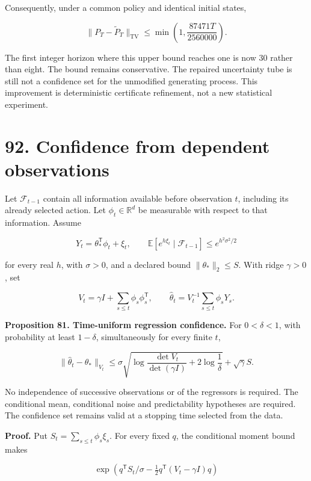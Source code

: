 \documentclass[11pt,letterpaper]{article}
\begin{document}
Consequently, under a common policy and identical initial states,

\[
\boxed{
\|P_T-\widetilde P_T\|_{\mathrm{TV}}
\leq\min\left(1,\frac{87471T}{2560000}\right).
}
\]

The first integer horizon where this upper bound reaches one is now 30
rather than eight. The bound remains conservative. The repaired
uncertainty tube is still not a confidence set for the unmodified
generating process. This improvement is deterministic certificate
refinement, not a new statistical experiment.

\newpage

\section{92. Confidence from dependent
observations}\label{confidence-from-dependent-observations}

Let \(\mathcal F_{t-1}\) contain all information available before
observation \(t\), including its already selected action. Let
\(\phi_t\in\mathbb R^d\) be measurable with respect to that information.
Assume

\[
Y_t=\theta_*^{\mathsf T}\phi_t+\xi_t,
\qquad
\mathbb E[e^{h\xi_t}\mid\mathcal F_{t-1}]
\leq e^{h^2\sigma^2/2}
\]

for every real \(h\), with \(\sigma>0\), and a declared bound
\(\|\theta_*\|_2\leq S\). With ridge \(\gamma>0\), set

\[
V_t=\gamma I+\sum_{s\leq t}\phi_s\phi_s^{\mathsf T},
\qquad
\widehat\theta_t=V_t^{-1}\sum_{s\leq t}\phi_sY_s.
\]

\textbf{Proposition 81. Time-uniform regression confidence.} For
\(0<\delta<1\), with probability at least \(1-\delta\), simultaneously
for every finite \(t\),

\[
\boxed{
\|\widehat\theta_t-\theta_*\|_{V_t}
\leq
\sigma\sqrt{
\log\frac{\det V_t}{\det(\gamma I)}+2\log\frac1\delta
}
+\sqrt\gamma S.
}
\]

No independence of successive observations or of the regressors is
required. The conditional mean, conditional noise and predictability
hypotheses are required. The confidence set remains valid at a stopping
time selected from the data.

\textbf{Proof.} Put \(S_t=\sum_{s\leq t}\phi_s\xi_s\). For every fixed
\(q\), the conditional moment bound makes

\[
\exp\left(q^{\mathsf T}S_t/\sigma
-\tfrac12q^{\mathsf T}(V_t-\gamma I)q\right)
\]
\end{document}

